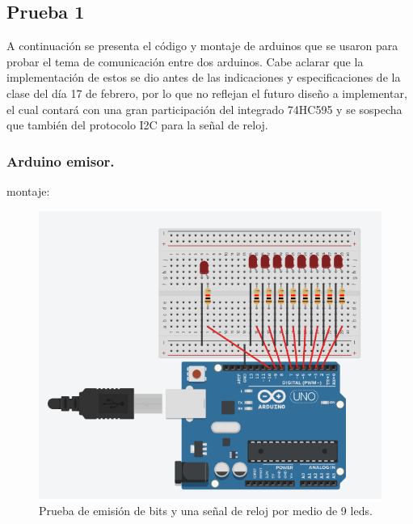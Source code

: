\documentclass{article}
\begin{document}
\subsection{Prueba 1}\label{intento1}
A continuación se presenta el código y montaje de arduinos que se usaron para probar el tema de comunicación entre dos arduinos. Cabe aclarar que la implementación de estos se dio antes de las indicaciones y especificaciones de la clase del día 17 de febrero, por lo que no reflejan el futuro diseño a implementar, el cual contará con una gran participación del integrado 74HC595 y se sospecha que también del protocolo I2C para la señal de reloj.

\subsubsection{Arduino emisor.}\label{intento1}

montaje:
\begin{figure}[h]
\includegraphics[scale=0.6]{emisor1.png}
\centering
\caption{Prueba de emisión de bits y una señal de reloj por medio de 9 leds.}
\label{fig:emisor1}
\end{figure}
\end{document}
